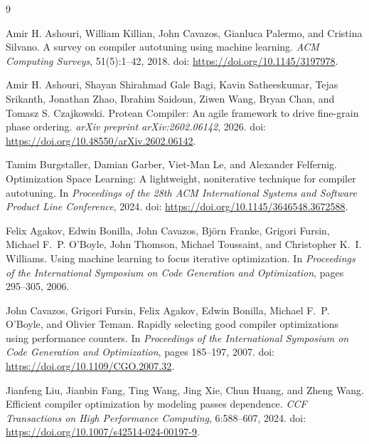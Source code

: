\documentclass{article}
\begin{document}
\begin{thebibliography}{9}

Amir H. Ashouri, William Killian, John Cavazos, Gianluca Palermo, and Cristina Silvano.
\newblock A survey on compiler autotuning using machine learning.
\newblock \emph{ACM Computing Surveys}, 51(5):1--42, 2018.
\newblock doi: \url{https://doi.org/10.1145/3197978}.

Amir H. Ashouri, Shayan Shirahmad Gale Bagi, Kavin Satheeskumar, Tejas Srikanth, Jonathan Zhao, Ibrahim Saidoun, Ziwen Wang, Bryan Chan, and Tomasz S. Czajkowski.
\newblock Protean Compiler: An agile framework to drive fine-grain phase ordering.
\newblock \emph{arXiv preprint arXiv:2602.06142}, 2026.
\newblock doi: \url{https://doi.org/10.48550/arXiv.2602.06142}.

Tamim Burgstaller, Damian Garber, Viet-Man Le, and Alexander Felfernig.
\newblock Optimization Space Learning: A lightweight, noniterative technique for compiler autotuning.
\newblock In \emph{Proceedings of the 28th ACM International Systems and Software Product Line Conference}, 2024.
\newblock doi: \url{https://doi.org/10.1145/3646548.3672588}.

Felix Agakov, Edwin Bonilla, John Cavazos, Bj\"orn Franke, Grigori Fursin, Michael F.~P. O'Boyle, John Thomson, Michael Toussaint, and Christopher K.~I. Williams.
\newblock Using machine learning to focus iterative optimization.
\newblock In \emph{Proceedings of the International Symposium on Code Generation and Optimization}, pages 295--305, 2006.

John Cavazos, Grigori Fursin, Felix Agakov, Edwin Bonilla, Michael F.~P. O'Boyle, and Olivier Temam.
\newblock Rapidly selecting good compiler optimizations using performance counters.
\newblock In \emph{Proceedings of the International Symposium on Code Generation and Optimization}, pages 185--197, 2007.
\newblock doi: \url{https://doi.org/10.1109/CGO.2007.32}.

Jianfeng Liu, Jianbin Fang, Ting Wang, Jing Xie, Chun Huang, and Zheng Wang.
\newblock Efficient compiler optimization by modeling passes dependence.
\newblock \emph{CCF Transactions on High Performance Computing}, 6:588--607, 2024.
\newblock doi: \url{https://doi.org/10.1007/s42514-024-00197-9}.


\end{thebibliography}
\end{document}
